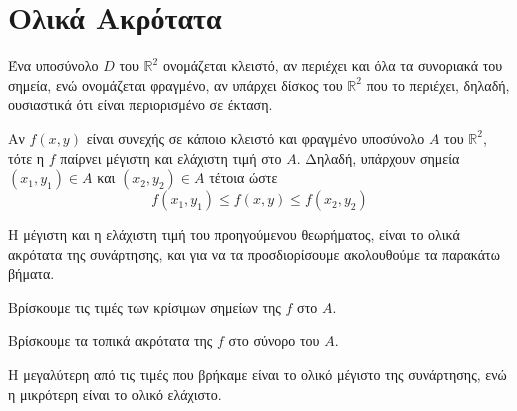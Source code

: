 \section{Ολικά Ακρότατα}

Ένα υποσύνολο $D$ του $ \mathbb{R}^{2} $ ονομάζεται κλειστό, αν περιέχει και όλα 
τα συνοριακά του σημεία, ενώ ονομάζεται φραγμένο, αν υπάρχει δίσκος του 
$ \mathbb{R}^{2} $ που το περιέχει, δηλαδή, ουσιαστικά ότι είναι περιορισμένο σε έκταση.

\begin{thm}
    Αν $f(x,y)$ είναι συνεχής σε κάποιο κλειστό και φραγμένο υποσύνολο $A$ του $
    \mathbb{R}^{2} $, τότε η $f$ παίρνει μέγιστη και ελάχιστη τιμή στο $A$. Δηλαδή, 
    υπάρχουν σημεία $ (x_{1}, y_{1}) \in A $ και $ (x_{2}, y_{2}) \in A $ τέτοια ώστε 
    \[
        f(x_{1}, y_{1}) \leq f(x,y) \leq f(x_{2}, y_{2})
    \]
\end{thm}

Η μέγιστη και η ελάχιστη τιμή του προηγούμενου θεωρήματος, είναι το ολικά ακρότατα 
της συνάρτησης, και για να τα προσδιορίσουμε ακολουθούμε τα παρακάτω βήματα.

\begin{myitemize}
    \item Βρίσκουμε τις τιμές των κρίσιμων σημείων της $f$ στο $A$.
    \item Βρίσκουμε τα τοπικά ακρότατα της $f$ στο σύνορο του $A$. 
    \item Η μεγαλύτερη από τις τιμές που βρήκαμε είναι το ολικό μέγιστο της 
        συνάρτησης, ενώ η μικρότερη είναι το ολικό ελάχιστο.
\end{myitemize}







   
